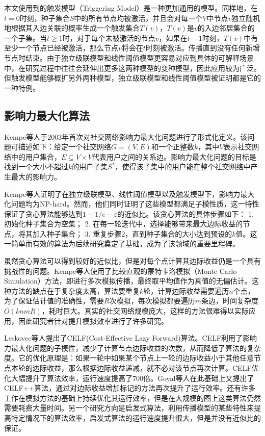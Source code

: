 本文使用到的触发模型（Triggering Model）是一种更加通用的模型。同样地，在$t=0$时刻，种子集合$S$中的所有节点均被激活，并且会对每一个$V$中节点$v$独立随机地根据其入边关联的概率生成一个触发集合$T(v)$，$T(v)$是$v$的入边邻居集合的一个子集。当$t\ge 1$时，对于每个未被激活的节点$v$，如果在$t-1$时刻，$T(v)$中有至少一个节点已经被激活，那么节点$v$将会在$t$时刻被激活。传播直到没有任何新增节点时结束。由于独立级联模型和线性阈值模型更容易对应到具体的可解释场景中，在研究过程中往往会延伸出更多这两种模型的变种模型，因此应用较为广泛。但触发模型能够概扩另外两种模型，独立级联模型和线性阈值模型被证明都是它的一种特例\cite{kempe2003maximizing}。


\subsection{影响力最大化算法}

Kempe等人\cite{kempe2003maximizing}于2003年首次对社交网络影响力最大化问题进行了形式化定义。该问题可描述如下：给定一个社交网络$G=(V,E)$和一个正整数$k$，其中$V$表示社交网络中的用户集合，$E \subseteq V \times V$代表用户之间的关系边。影响力最大化问题的目标是找到一个大小不超过$k$的用户子集$S^*$，使得该子集中的用户能在整个社交网络中产生最大的影响力。

Kempe等人证明了在独立级联模型、线性阈值模型以及触发模型下，影响力最大化问题均为NP-hard。然而，他们同时证明了这些模型都满足子模性质，这一特性保证了贪心算法能够达到$1-1/e-\varepsilon$的近似比。该贪心算法的具体步骤如下：
1. 初始化种子集合为空集；
2. 在每一轮迭代中，选择能够带来最大边际收益的节点，将其加入种子集合；
3. 重复步骤2，直到种子集合的大小达到预设的$k$值。这一简单而有效的算法为后续研究奠定了基础，成为了该领域的重要里程碑。

虽然贪心算法可以得到较好的近似比，但是对每个点计算其边际收益仍是一个具有挑战性的问题。Kempe等人使用了比较直观的蒙特卡洛模拟（Monte Carlo Simulation）方法，即进行多次模拟传播，最终取平均值作为真值的无偏估计。这种方法的缺点在于复杂度太高，算法要重复$k$轮，计算边际收益需要遍历$n$个点，为了保证估计值的准确性，需要$R$次模拟，每次模拟都要遍历$m$条边，时间复杂度$O(knmR)$，耗时巨大。真实的社交网络规模庞大，这样的方法很难得以实际应用，因此研究者针对提升模拟效率进行了许多研究。

Leskovec等人提出了CELF(Cost-Effective Lazy Forward)算法\cite{leskovec2007cost}。CELF利用了影响力最大化问题的子模性，减少了计算节点边际收益的次数，从而降低了算法的复杂度。它的优化原理是：如果一轮中如果某个节点上一轮的边际收益小于其他任意节点本轮的边际收益，那么根据边际收益递减，就不必对该节点再次计算。CELF优化大幅提升了算法效率，运行速度提高了700倍。Goyal等人\cite{goyal2011celf++}在此基础上又提出了CELF++算法，通过对边际收益增加标记的方法再次提升了运行效率。还有许多工作在模拟方法的基础上持续优化其运行效率\cite{kumar2022csr,王璿2022基于社交网络的影响力最大化算法}，但是在大规模的图上这类算法仍然需要耗费大量时间。另一个研究方向是启发式算法，利用传播模型的某些特性来提高特定情况下的算法效率\cite{kumar2022mder,lozano2024efficient,chen2009efficient,chen2010scalable,chen2010scalable2,goyal2011simpath}，启发式算法的运行速度提升很大，但是并没有近似比的保证。

